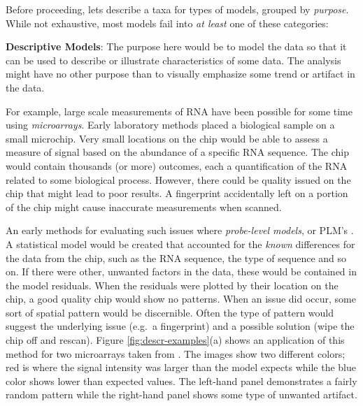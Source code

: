 \documentclass[11pt]{book}
\begin{document}
Before proceeding, lets describe a taxa for types of models, grouped by \emph{purpose}. While not exhaustive, most models fail into \emph{at least} one of these categories:

\textbf{Descriptive Models}: The purpose here would be to model the data so that it can be used to describe or illustrate characteristics of some data. The analysis might have no other purpose than to visually emphasize some trend or artifact in the data.

For example, large scale measurements of RNA have been possible for some time using \emph{microarrays}. Early laboratory methods placed a biological sample on a small microchip. Very small locations on the chip would be able to assess a measure of signal based on the abundance of a specific RNA sequence. The chip would contain thousands (or more) outcomes, each a quantification of the RNA related to some biological process. However, there could be quality issued on the chip that might lead to poor results. A fingerprint accidentally left on a portion of the chip might cause inaccurate measurements when scanned.

An early methods for evaluating such issues where \emph{probe-level models}, or PLM's \citep{bolstad2004}. A statistical model would be created that accounted for the \emph{known} differences for the data from the chip, such as the RNA sequence, the type of sequence and so on. If there were other, unwanted factors in the data, these would be contained in the model residuals. When the residuals were plotted by their location on the chip, a good quality chip would show no patterns. When an issue did occur, some sort of spatial pattern would be discernible. Often the type of pattern would suggest the underlying issue (e.g.~a fingerprint) and a possible solution (wipe the chip off and rescan). Figure \ref{fig:descr-examples}(a) shows an application of this method for two microarrays taken from \citet{Gentleman2005}. The images show two different colors; red is where the signal intensity was larger than the model expects while the blue color shows lower than expected values. The left-hand panel demonstrates a fairly random pattern while the right-hand panel shows some type of unwanted artifact.
\end{document}
